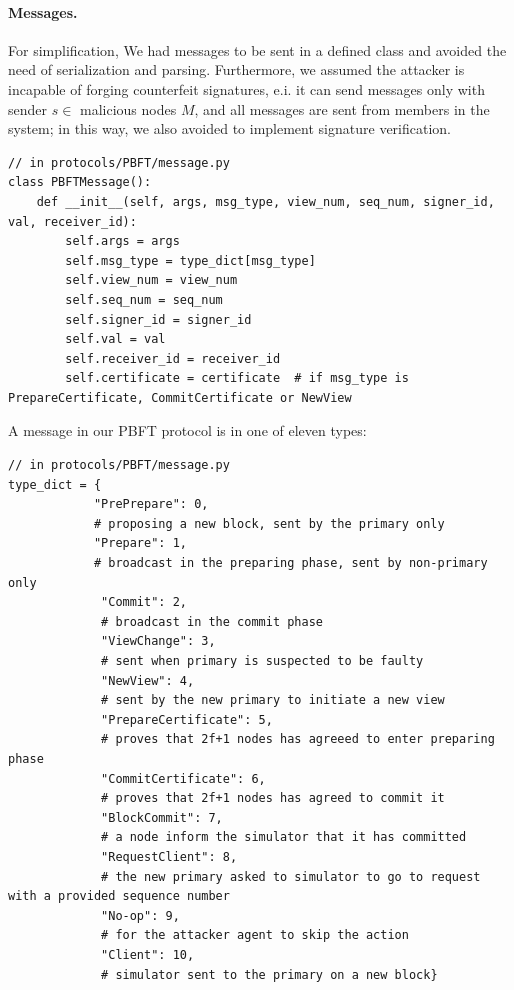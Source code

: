 \documentclass[a4paper,11pt]{article}
\begin{document}
\paragraph{Messages.} For simplification, We had messages to be sent in a defined class and avoided the need of serialization and parsing. Furthermore, we assumed the attacker is incapable of forging counterfeit signatures, e.i. it can send messages only with sender $s \in$ malicious nodes $M$, and all messages are sent from members in the system; in this way, we also avoided to implement signature verification.
\begin{lstlisting}
// in protocols/PBFT/message.py
class PBFTMessage():
    def __init__(self, args, msg_type, view_num, seq_num, signer_id, val, receiver_id):
        self.args = args
        self.msg_type = type_dict[msg_type]
        self.view_num = view_num
        self.seq_num = seq_num
        self.signer_id = signer_id
        self.val = val
        self.receiver_id = receiver_id
        self.certificate = certificate  # if msg_type is PrepareCertificate, CommitCertificate or NewView
\end{lstlisting}    
A message in our PBFT protocol is in one of eleven types: 
\begin{lstlisting}
// in protocols/PBFT/message.py
type_dict = {
            "PrePrepare": 0,  
            # proposing a new block, sent by the primary only
            "Prepare": 1,     
            # broadcast in the preparing phase, sent by non-primary only
             "Commit": 2,      
             # broadcast in the commit phase
             "ViewChange": 3,  
             # sent when primary is suspected to be faulty
             "NewView": 4,     
             # sent by the new primary to initiate a new view
             "PrepareCertificate": 5, 
             # proves that 2f+1 nodes has agreeed to enter preparing phase
             "CommitCertificate": 6,  
             # proves that 2f+1 nodes has agreed to commit it
             "BlockCommit": 7,        
             # a node inform the simulator that it has committed
             "RequestClient": 8,      
             # the new primary asked to simulator to go to request with a provided sequence number
             "No-op": 9,
             # for the attacker agent to skip the action
             "Client": 10, 
             # simulator sent to the primary on a new block}
\end{lstlisting}
\end{document}
